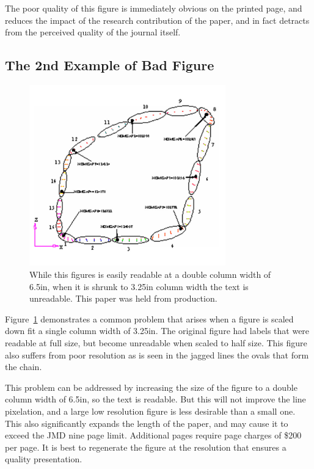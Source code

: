 \documentclass[twocolumn,10pt,journal]{asme2e}
\begin{document}
The poor quality of this figure is immediately obvious on the printed page, and reduces the impact of the research contribution of the paper, and in fact detracts from the perceived quality of the journal itself.



\subsection{The 2nd Example of Bad Figure}

\begin{figure}
 \centerline{\includegraphics[width=3.34in]{figure/FMANU_MD_05_1272_5}}
 \caption{While this figures is easily readable at a double column width of 6.5in, when it is shrunk to 3.25in column width the text is unreadable.
  This paper was held from production.}
 \label{fig_example2.ps}
\end{figure}

Figure~\ref{fig_example2.ps} demonstrates a common problem that arises when a figure is scaled down fit a single column width of 3.25in.
The original figure had labels that were readable at full size, but become unreadable when scaled to half size.
This figure also suffers from poor resolution as is seen in the jagged lines the ovals that form the chain.

This problem can be addressed by increasing the size of the figure to a double column width of 6.5in, so the text is readable.
But this will not improve the line pixelation, and a large low resolution figure is less desirable than a small one.
This also significantly expands the length of the paper, and may cause it to exceed the JMD nine page limit.
Additional pages require page charges of
\$200 per page.
It is best to regenerate the figure at the resolution that ensures a quality presentation.
\end{document}
